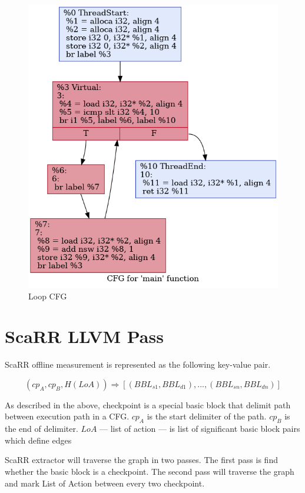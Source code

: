 \begin{figure}[htbp]
\centerline{\includegraphics[scale=.5]{Figures/loop-cfg.png}}
\caption{Loop CFG}
\label{fig:4-5}
\end{figure}

\section{ScaRR LLVM Pass}

ScaRR offline measurement is represented as the following key-value pair.

$$(cp_A, cp_B, H(LoA)) \Rightarrow [(BBL_{s1}, BBL_{d1}), ..., (BBL_{sn}, BBL_{dn})]$$

As described in the above, checkpoint is a special basic block that delimit path between execution path in a CFG. $cp_A$ is the start delimiter of the path. $cp_B$ is the end of delimiter. $LoA$ — list of action — is list of significant basic block pairs which define edges 

ScaRR extractor will traverse the graph in two passes. The first pass is find whether the basic block is a checkpoint. The second pass will traverse the graph and mark List of Action between every two checkpoint. 

